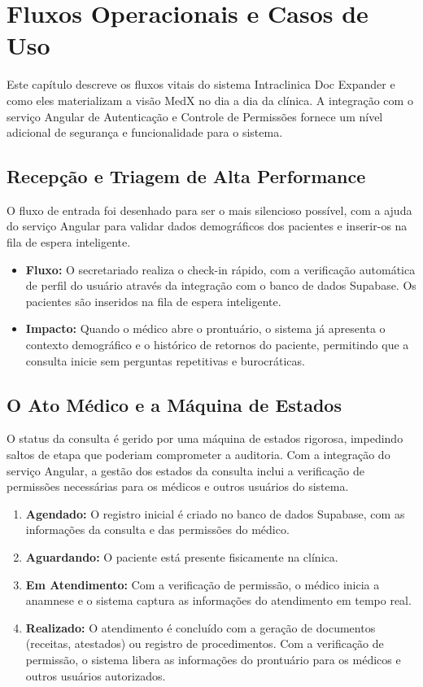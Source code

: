  \chapter{Fluxos Operacionais e Casos de Uso}

Este capítulo descreve os fluxos vitais do sistema Intraclinica Doc Expander e como eles materializam a visão MedX no dia a dia da clínica. A integração com o serviço Angular de Autenticação e Controle de Permissões fornece um nível adicional de segurança e funcionalidade para o sistema.

\section{Recepção e Triagem de Alta Performance}

O fluxo de entrada foi desenhado para ser o mais silencioso possível, com a ajuda do serviço Angular para validar dados demográficos dos pacientes e inserir-os na fila de espera inteligente.
\begin{itemize}
    \item \textbf{Fluxo:} O secretariado realiza o check-in rápido, com a verificação automática de perfil do usuário através da integração com o banco de dados Supabase. Os pacientes são inseridos na fila de espera inteligente.
    \item \textbf{Impacto:} Quando o médico abre o prontuário, o sistema já apresenta o contexto demográfico e o histórico de retornos do paciente, permitindo que a consulta inicie sem perguntas repetitivas e burocráticas.
\end{itemize}

\section{O Ato Médico e a Máquina de Estados}

O status da consulta é gerido por uma máquina de estados rigorosa, impedindo saltos de etapa que poderiam comprometer a auditoria. Com a integração do serviço Angular, a gestão dos estados da consulta inclui a verificação de permissões necessárias para os médicos e outros usuários do sistema.
\begin{enumerate}
    \item \textbf{Agendado:} O registro inicial é criado no banco de dados Supabase, com as informações da consulta e das permissões do médico.
    \item \textbf{Aguardando:} O paciente está presente fisicamente na clínica.
    \item \textbf{Em Atendimento:} Com a verificação de permissão, o médico inicia a anamnese e o sistema captura as informações do atendimento em tempo real.
    \item \textbf{Realizado:} O atendimento é concluído com a geração de documentos (receitas, atestados) ou registro de procedimentos. Com a verificação de permissão, o sistema libera as informações do prontuário para os médicos e outros usuários autorizados.
\end{enumerate}

